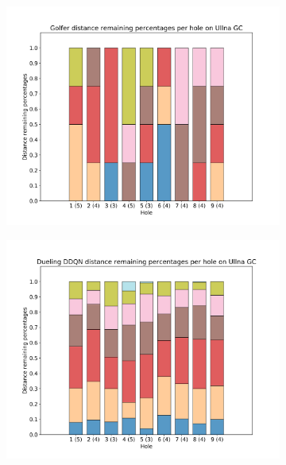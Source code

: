 \documentclass{kththesis}
\begin{document}
\begin{figure}
{\begin{subfigure}{0.3\paperwidth}
    \includegraphics[width=0.3\paperwidth]{L2Percentages/L2_Distance_Percentages_Ullna.png} 
    \end{subfigure}
    \begin{subfigure}{0.3\paperwidth}
    \centering
    \includegraphics[width=0.3\paperwidth]{AgentPercentages/DDDQN_Distance_Percentages_Ullna.png} 
    \end{subfigure}
    \begin{subfigure}{0.3\paperwidth}
    \centering

\end{subfigure}}
\end{figure}
\end{document}
